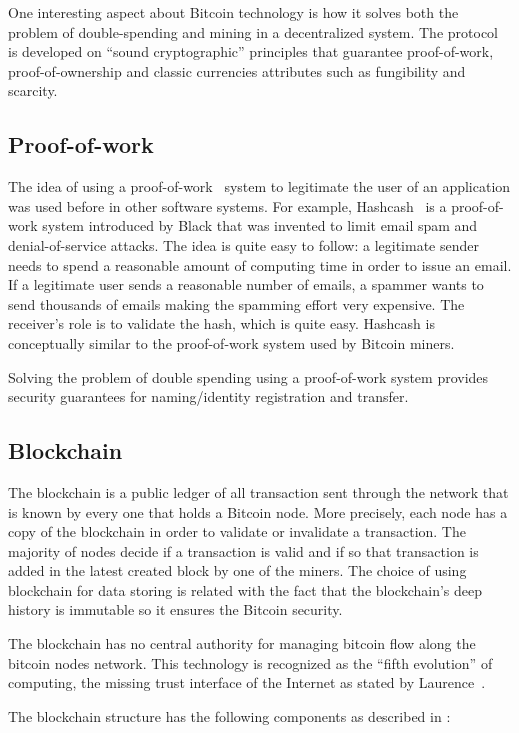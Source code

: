 One interesting aspect about Bitcoin technology is how it solves both the problem of double-spending and mining in a decentralized system. The protocol is developed on “sound cryptographic” principles that guarantee proof-of-work, proof-of-ownership and classic currencies attributes such as fungibility and scarcity.
\subsection{Proof-of-work}
\label{subsec:proof-of-work}
The idea of using a proof-of-work~\cite{proofofwork} system to legitimate the user of an application was used before in other software systems.
For example, Hashcash~\cite{hashcash} is a proof-of-work system introduced by Black that was invented to limit email spam and denial-of-service attacks. The idea is quite easy to follow: a legitimate sender needs to spend a reasonable amount of computing time in order to issue an email. If a legitimate user sends a reasonable number of emails, a spammer wants to send thousands of emails making the spamming effort very expensive. The receiver’s role is to validate the hash, which is quite easy. Hashcash is conceptually similar to the proof-of-work system used by Bitcoin miners.

Solving the problem of double spending using a proof-of-work system provides security guarantees for naming/identity registration and transfer.


\subsection{Blockchain}
\label{subsec:blockchain-lbl}
The blockchain is a public ledger of all transaction sent through the network that is known by every one that holds a Bitcoin node. More precisely, each node has a copy of the blockchain in order to validate or invalidate a transaction. The majority of nodes decide if a transaction is valid and if so that transaction is added in the latest created block by one of the miners. The choice of using blockchain for data storing is related with the fact that the blockchain’s deep history is immutable so it ensures the Bitcoin security.

The blockchain has no central authority for managing bitcoin flow along the bitcoin nodes network. This technology is recognized as the “fifth evolution” of computing, the missing trust interface of the Internet as stated by Laurence~\cite{blockchaind}.

The blockchain structure has the following components as described in :

